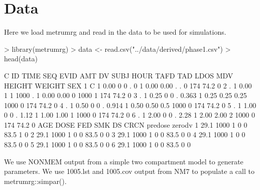 \section{Data}
Here we load metrumrg and read in the data to be used
for simulations.
\begin{Schunk}
\begin{Sinput}
> library(metrumrg)
> data <- read.csv("../data/derived/phase1.csv")
> head(data)
\end{Sinput}
\begin{Soutput}
  C ID TIME SEQ EVID  AMT    DV SUBJ HOUR TAFD  TAD LDOS MDV HEIGHT WEIGHT SEX
1 C  1 0.00   0    0    .     0    1 0.00 0.00    .    .   0    174   74.2   0
2 .  1 0.00   1    1 1000     .    1 0.00 0.00    0 1000   1    174   74.2   0
3 .  1 0.25   0    0    . 0.363    1 0.25 0.25 0.25 1000   0    174   74.2   0
4 .  1 0.50   0    0    . 0.914    1 0.50 0.50  0.5 1000   0    174   74.2   0
5 .  1 1.00   0    0    .  1.12    1 1.00 1.00    1 1000   0    174   74.2   0
6 .  1 2.00   0    0    .  2.28    1 2.00 2.00    2 1000   0    174   74.2   0
   AGE DOSE FED SMK DS CRCN predose zerodv
1 29.1 1000   1   0  0 83.5       1      0
2 29.1 1000   1   0  0 83.5       0      0
3 29.1 1000   1   0  0 83.5       0      0
4 29.1 1000   1   0  0 83.5       0      0
5 29.1 1000   1   0  0 83.5       0      0
6 29.1 1000   1   0  0 83.5       0      0
\end{Soutput}
\end{Schunk}
We use NONMEM output from a simple two compartment model to generate parameters.
We use 1005.lst and 1005.cov output from NM7 to populate a call to metrumrg::simpar().
